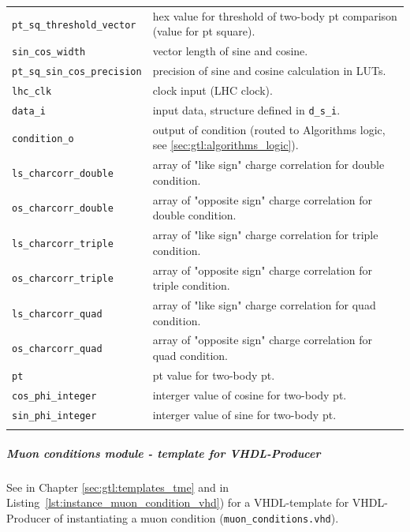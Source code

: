 \begin{longtable}{>{\footnotesize}l >{\footnotesize}p{}}
\verb|pt_sq_threshold_vector| & hex value for threshold of two-body pt comparison (value for pt square).\\
\verb|sin_cos_width| & vector length of sine and cosine.\\
\verb|pt_sq_sin_cos_precision| & precision of sine and cosine calculation in LUTs.\\
\verb|lhc_clk| & clock input (LHC clock).\\
\verb|data_i| & input data, structure defined in \texttt{d\_s\_i}.\\
\verb|condition_o| & output of condition (routed to Algorithms logic, see \ref{sec:gtl:algorithms_logic}).\\
\verb|ls_charcorr_double| & array of "like sign" charge correlation for double condition.\\
\verb|os_charcorr_double| & array of "opposite sign" charge correlation for double condition.\\
\verb|ls_charcorr_triple| & array of "like sign" charge correlation for triple condition.\\
\verb|os_charcorr_triple| & array of "opposite sign" charge correlation for triple condition.\\
\verb|ls_charcorr_quad| & array of "like sign" charge correlation for quad condition.\\
\verb|os_charcorr_quad| & array of "opposite sign" charge correlation for quad condition.\\
\verb|pt| & pt value for two-body pt.\\
\verb|cos_phi_integer| & interger value of cosine for two-body pt.\\
\verb|sin_phi_integer| & interger value of sine for two-body pt.\\
\hline 
\label{tab:gtl:explanation_muon_conditions_vhd}
\end{longtable}

\clearpage

\subparagraph{Muon conditions module - template for VHDL-Producer}
See in Chapter \ref{sec:gtl:templates_tme} and in Listing~\ref{lst:instance_muon_condition_vhd}) for a VHDL-template for VHDL-Producer of
instantiating a muon condition (\texttt{muon\_conditions.vhd}).\\

